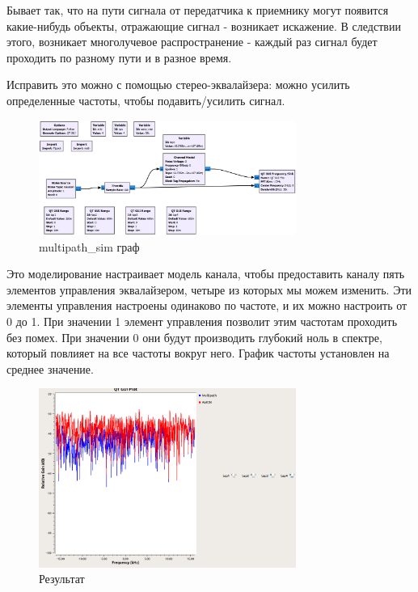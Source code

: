 \documentclass[a4paper,12pt]{article}
\begin{document}
	Бывает так, что на пути сигнала от передатчика к приемнику могут появится какие-нибудь объекты, отражающие сигнал - возникает искажение. В следствии этого, возникает многолучевое распространение - каждый раз сигнал будет проходить по разному пути и в разное время.
	
	Исправить это можно с помощью стерео-эквалайзера: можно усилить определенные частоты, чтобы подавить/усилить сигнал.
	
	\begin{figure}[H]
		\centering
		\includegraphics[width=0.75\textwidth]{4_1.png}
		\caption{multipath\_sim граф}
		\label{fig:4.1}
	\end{figure}
	
	Это моделирование настраивает модель канала, чтобы предоставить каналу пять элементов управления эквалайзером, четыре из которых мы можем изменить. Эти элементы управления настроены одинаково по частоте, и их можно настроить от 0 до 1. При значении 1 элемент управления позволит этим частотам проходить без помех. При значении 0 они будут производить глубокий ноль в спектре, который повлияет на все частоты вокруг него. График частоты установлен на среднее значение.
	
	\begin{figure}[H]
		\centering
		\includegraphics[width=0.75\textwidth]{4_2.png}
		\caption{Результат}
		\label{fig:4.2}
	\end{figure}
	
\end{document}
